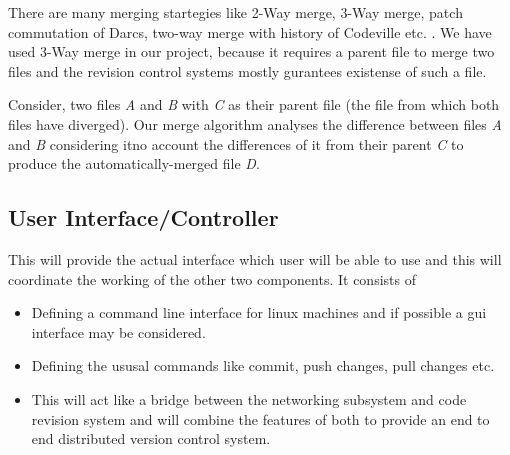 \documentclass[12pt]{article}
\begin{document}
There are many merging startegies like 2-Way merge, 3-Way merge, patch commutation of Darcs,  two-way merge with history of Codeville etc. \cite{WIKIMERGE}.
We have used 3-Way merge in our project, because it requires a parent file to merge two files and the revision control systems mostly gurantees existense of such a file.

Consider, two files \emph{A} and \emph{B} with \emph{C} as their parent file (the file from which both files have diverged). Our merge algorithm analyses the difference between files \emph{A} and \emph{B} considering itno account the differences of it from their parent \emph{C} to produce the automatically-merged file \emph{D}. 

\subsection{User Interface/Controller}
This will provide the actual interface which user will be able to use and this
will coordinate the working of the other two components.
It consists of
\begin{itemize}
\item Defining a command line interface for linux machines and if possible a
  gui interface may be considered.
\item Defining the ususal commands like commit, push changes, pull changes
  etc.
\item This will act like a bridge between the networking subsystem and code
  revision system and will combine the features of both to provide an end to
  end distributed version control system.
\end{itemize}
\end{document}
